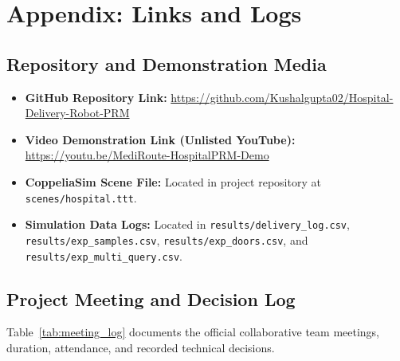 \documentclass[12pt,a4paper]{article}
\begin{document}
\newpage

\clearpage
\section*{Appendix: Links and Logs}

\subsection*{Repository and Demonstration Media}
\begin{itemize}[itemsep=2pt,topsep=2pt]
\item \textbf{GitHub Repository Link:} \url{https://github.com/Kushalgupta02/Hospital-Delivery-Robot-PRM}
\item \textbf{Video Demonstration Link (Unlisted YouTube):} \url{https://youtu.be/MediRoute-HospitalPRM-Demo}
\item \textbf{CoppeliaSim Scene File:} Located in project repository at \texttt{scenes/hospital.ttt}.
\item \textbf{Simulation Data Logs:} Located in \texttt{results/delivery\_log.csv}, \texttt{results/exp\_samples.csv}, \texttt{results/exp\_doors.csv}, and \texttt{results/exp\_multi\_query.csv}.
\end{itemize}

\subsection*{Project Meeting and Decision Log}
Table~\ref{tab:meeting_log} documents the official collaborative team meetings, duration, attendance, and recorded technical decisions.
\end{document}
